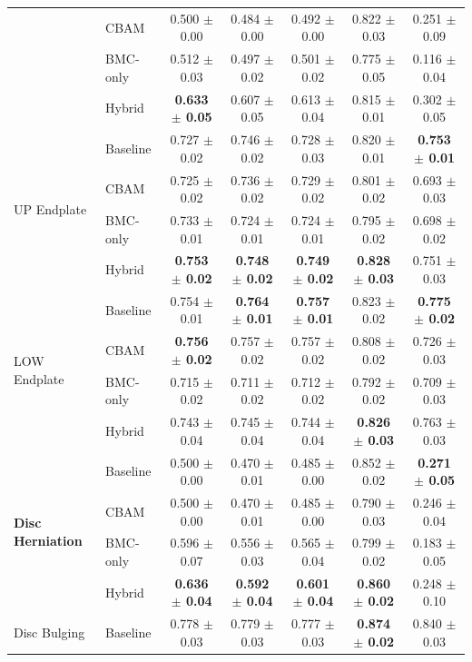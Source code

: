 \begin{table}[H]
{\begin{tabular}{llccccc}
 & CBAM     & 0.500 $\pm$ 0.00 & 0.484 $\pm$ 0.00 & 0.492 $\pm$ 0.00 & 0.822 $\pm$ 0.03 & 0.251 $\pm$ 0.09 \\
 & BMC-only & 0.512 $\pm$ 0.03 & 0.497 $\pm$ 0.02 & 0.501 $\pm$ 0.02 & 0.775 $\pm$ 0.05 & 0.116 $\pm$ 0.04 \\
 & Hybrid   & \textbf{0.633 $\pm$ 0.05} & 0.607 $\pm$ 0.05 & 0.613 $\pm$ 0.04 & 0.815 $\pm$ 0.01 & 0.302 $\pm$ 0.05 \\
\midrule
\multirow{4}{*}{UP Endplate}
 & Baseline & 0.727 $\pm$ 0.02 & 0.746 $\pm$ 0.02 & 0.728 $\pm$ 0.03 & 0.820 $\pm$ 0.01 & \textbf{0.753 $\pm$ 0.01} \\
 & CBAM     & 0.725 $\pm$ 0.02 & 0.736 $\pm$ 0.02 & 0.729 $\pm$ 0.02 & 0.801 $\pm$ 0.02 & 0.693 $\pm$ 0.03 \\
 & BMC-only & 0.733 $\pm$ 0.01 & 0.724 $\pm$ 0.01 & 0.724 $\pm$ 0.01 & 0.795 $\pm$ 0.02 & 0.698 $\pm$ 0.02 \\
 & Hybrid   & \textbf{0.753 $\pm$ 0.02} & \textbf{0.748 $\pm$ 0.02} & \textbf{0.749 $\pm$ 0.02} & \textbf{0.828 $\pm$ 0.03} & 0.751 $\pm$ 0.03 \\
\midrule
\multirow{4}{*}{LOW Endplate}
 & Baseline & 0.754 $\pm$ 0.01 & \textbf{0.764 $\pm$ 0.01} & \textbf{0.757 $\pm$ 0.01} & 0.823 $\pm$ 0.02 & \textbf{0.775 $\pm$ 0.02} \\
 & CBAM     & \textbf{0.756 $\pm$ 0.02} & 0.757 $\pm$ 0.02 & 0.757 $\pm$ 0.02 & 0.808 $\pm$ 0.02 & 0.726 $\pm$ 0.03 \\
 & BMC-only & 0.715 $\pm$ 0.02 & 0.711 $\pm$ 0.02 & 0.712 $\pm$ 0.02 & 0.792 $\pm$ 0.02 & 0.709 $\pm$ 0.03 \\
 & Hybrid   & 0.743 $\pm$ 0.04 & 0.745 $\pm$ 0.04 & 0.744 $\pm$ 0.04 & \textbf{0.826 $\pm$ 0.03} & 0.763 $\pm$ 0.03 \\
\midrule
\multirow{4}{*}{\textbf{Disc Herniation}}
 & Baseline & 0.500 $\pm$ 0.00 & 0.470 $\pm$ 0.01 & 0.485 $\pm$ 0.00 & 0.852 $\pm$ 0.02 & \textbf{0.271 $\pm$ 0.05} \\
 & CBAM     & 0.500 $\pm$ 0.00 & 0.470 $\pm$ 0.01 & 0.485 $\pm$ 0.00 & 0.790 $\pm$ 0.03 & 0.246 $\pm$ 0.04 \\
 & BMC-only & 0.596 $\pm$ 0.07 & 0.556 $\pm$ 0.03 & 0.565 $\pm$ 0.04 & 0.799 $\pm$ 0.02 & 0.183 $\pm$ 0.05 \\
 & Hybrid   & \textbf{0.636 $\pm$ 0.04} & \textbf{0.592 $\pm$ 0.04} & \textbf{0.601 $\pm$ 0.04} & \textbf{0.860 $\pm$ 0.02} & 0.248 $\pm$ 0.10 \\
\midrule
\multirow{4}{*}{Disc Bulging}
 & Baseline & 0.778 $\pm$ 0.03 & 0.779 $\pm$ 0.03 & 0.777 $\pm$ 0.03 & \textbf{0.874 $\pm$ 0.02} & 0.840 $\pm$ 0.03 \\

\end{tabular}}
\end{table}
